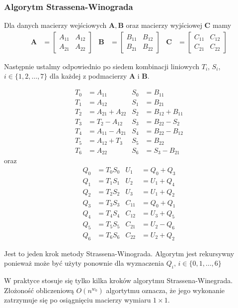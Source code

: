 \subsubsection{Algorytm Strassena-Winograda}
Dla danych macierzy wejściowych \(\mathbf{A}, \mathbf{B}\) oraz macierzy wyjściowej \(\mathbf{C}\) mamy
\begin{align*}
\mathbf{A}& = \begin{bmatrix} A_{11}& A_{12} \\ A_{21}& A_{22} \end{bmatrix}&
\mathbf{B}& = \begin{bmatrix} B_{11}& B_{12} \\ B_{21}& B_{22} \end{bmatrix}&
\mathbf{C}& = \begin{bmatrix} C_{11}& C_{12} \\ C_{21}& C_{22} \end{bmatrix}
\end{align*}

Następnie ustalmy odpowiednio po siedem kombinacji liniowych \(T_i\), \(S_i\), \(i\in \{1, 2, \dots,7\}\) dla każdej z podmacierzy \(\mathbf{A}\) i \(\mathbf{B}\).

\begin{align*}
T_0& = A_{11}& S_0 &= B_{11}\\
T_1& = A_{12}& S_1 &= B_{21}\\
T_2& = A_{21} + A_{22}& S_2 &= B_{12}+B_{11}\\
T_3& = T_2 - A_{12}& S_3 &= B_{22}-S_2\\
T_4& = A_{11}-A_{21}& S_4 &= B_{22}-B_{12}\\
T_5& = A_{12}+T_3& S_5 &= B_{22}\\
T_6& = A_{22}& S_6 &= S_3-B_{21}
\end{align*}
oraz
\begin{align*}
Q_0& = T_{0}S_{0}& U_1 &= Q_{0} + Q_{3}\\
Q_1& = T_{1}S_{1}& U_2 &= U_{1} + Q_{4}\\
Q_2& = T_{2}S_{2}& U_3 &= U_{1} + Q_{2}\\
Q_3& = T_{3}S_{3}& C_{11} &= Q_{0} + Q_{1}\\
Q_4& = T_{4}S_{4}& C_{12} &= U_{3} + Q_{5}\\
Q_5& = T_{5}S_{5}& C_{21} &= U_{2} - Q_{6}\\
Q_6& = T_{6}S_{6}& C_{22} &= U_{2} + Q_{2}
\end{align*}

Jest to jeden krok metody Strassena-Winograda. Algorytm jest rekursywny ponieważ może być użyty ponownie dla wyznaczenia \(Q_i,\,i\in\{0,1,\dots,6\}\)

W praktyce stosuje się tylko kilka kroków algorytmu Strassena-Winegrada\cite{DBLP:journals/corr/abs-1202-3173}. Złożoność obliczeniową \(O(n^{w_0})\) algortytmu oznacza, że jego wykonanie zatrzymuje się po osiągnięciu macierzy wymiaru \(1\times 1\).
